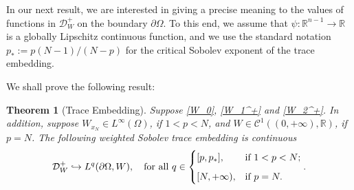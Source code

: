 \documentclass[12pt]{amsart}
\newtheorem{theorem}{Theorem}[section]
\newtheorem{remark}[theorem]{Remark}
\theoremstyle{definition}
\theoremstyle{plain}
\newcommand{\dint}{\int_{\Omega}}
\begin{document}

    In our next result, we are interested in giving a precise meaning to the values of  
    functions in  $\mathcal{D}_W^+$ on the boundary $\partial\Omega$. To this end, we assume 
    that $\psi:\mathbb{R}^{n-1}\to\mathbb{R}$ is a globally Lipschitz continuous function, and 
    we use the standard notation $p_* := p(N-1)/(N-p)$ for the critical Sobolev exponent of 
    the trace embedding.
    
  We shall prove the following result:
\begin{theorem}[Trace Embedding]\label{trace-positive}
		Suppose \eqref{W_0}, \eqref{W_1^+} and  \eqref{W_2^+}. In addition, 
        suppose $W_{x_N} \in L^{\infty}(\Omega)$, if $1<p<N$, and $W \in 
        \mathcal{C}^1((0,+\infty),\mathbb{R})$, if $p=N$.        The following weighted 
        Sobolev trace embedding is continuous        
$$       \mathcal{D}_W^+ \hookrightarrow L^q(\partial\Omega, W) , \quad 
\text{for all } q \in \begin{cases} [p,p_*], & \text{if } 1<p<N; \medskip \\ 
[N,+\infty), & \text{if } p=N.\end{cases}.
$$
 \end{theorem} 
\end{document}
